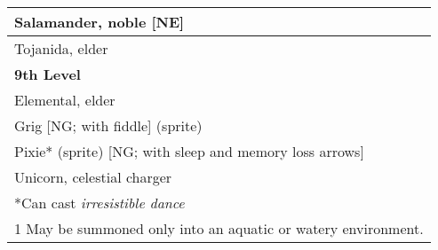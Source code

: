 \begin{longtable}{ll}
{\begin{minipage}[t]{3.857in}
Salamander, noble [NE]\end{minipage}}\\
\hline
\multicolumn{2}{|p{3.857in}|}{\begin{minipage}[t]{3.857in}\raggedright
Tojanida, elder\end{minipage}}\\
\hline
\multicolumn{2}{|p{3.857in}|}{\begin{minipage}[t]{3.857in}\raggedright
\textbf{9th Level}\end{minipage}}\\
\hline
\multicolumn{2}{|p{3.857in}|}{\begin{minipage}[t]{3.857in}\raggedright
Elemental, elder\end{minipage}}\\
\hline
\multicolumn{2}{|p{3.857in}|}{\begin{minipage}[t]{3.857in}\raggedright
Grig [NG; with fiddle] (sprite)\end{minipage}}\\
\hline
\multicolumn{2}{|p{3.857in}|}{\begin{minipage}[t]{3.857in}\raggedright
Pixie* (sprite) [NG; with sleep and memory loss arrows]\end{minipage}}\\
\hline
\multicolumn{2}{|p{3.857in}|}{\begin{minipage}[t]{3.857in}\raggedright
Unicorn, celestial charger\end{minipage}}\\
\hline
\multicolumn{2}{|p{3.857in}|}{\begin{minipage}[t]{3.857in}\raggedright
*Can cast \textit{irresistible dance}\end{minipage}}\\
\hline
\multicolumn{2}{|p{3.857in}|}{\begin{minipage}[t]{3.857in}\raggedright
1 May be summoned only into an aquatic or watery environment.\end{minipage}}\\
\hline
\end{longtable}

